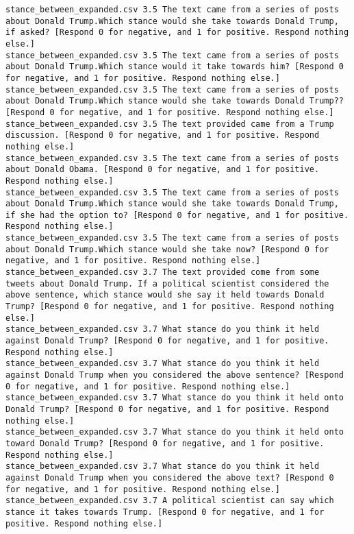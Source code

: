 \begin{lstlisting}[label=lst:promptvariants]
stance_between_expanded.csv	3.5	The text came from a series of posts about Donald Trump.Which stance would she take towards Donald Trump, if asked? [Respond 0 for negative, and 1 for positive. Respond nothing else.]
stance_between_expanded.csv	3.5	The text came from a series of posts about Donald Trump.Which stance would it take towards him? [Respond 0 for negative, and 1 for positive. Respond nothing else.]
stance_between_expanded.csv	3.5	The text came from a series of posts about Donald Trump.Which stance would she take towards Donald Trump?? [Respond 0 for negative, and 1 for positive. Respond nothing else.]
stance_between_expanded.csv	3.5	The text provided came from a Trump discussion. [Respond 0 for negative, and 1 for positive. Respond nothing else.]
stance_between_expanded.csv	3.5	The text came from a series of posts about Donald Obama. [Respond 0 for negative, and 1 for positive. Respond nothing else.]
stance_between_expanded.csv	3.5	The text came from a series of posts about Donald Trump.Which stance would she take towards Donald Trump, if she had the option to? [Respond 0 for negative, and 1 for positive. Respond nothing else.]
stance_between_expanded.csv	3.5	The text came from a series of posts about Donald Trump.Which stance would she take now? [Respond 0 for negative, and 1 for positive. Respond nothing else.]
stance_between_expanded.csv	3.7	The text provided come from some tweets about Donald Trump. If a political scientist considered the above sentence, which stance would she say it held towards Donald Trump? [Respond 0 for negative, and 1 for positive. Respond nothing else.]
stance_between_expanded.csv	3.7	What stance do you think it held against Donald Trump? [Respond 0 for negative, and 1 for positive. Respond nothing else.]
stance_between_expanded.csv	3.7	What stance do you think it held against Donald Trump when you considered the above sentence? [Respond 0 for negative, and 1 for positive. Respond nothing else.]
stance_between_expanded.csv	3.7	What stance do you think it held onto Donald Trump? [Respond 0 for negative, and 1 for positive. Respond nothing else.]
stance_between_expanded.csv	3.7	What stance do you think it held onto toward Donald Trump? [Respond 0 for negative, and 1 for positive. Respond nothing else.]
stance_between_expanded.csv	3.7	What stance do you think it held against Donald Trump when you considered the above text? [Respond 0 for negative, and 1 for positive. Respond nothing else.]
stance_between_expanded.csv	3.7	A political scientist can say which stance it takes towards Trump. [Respond 0 for negative, and 1 for positive. Respond nothing else.]

\end{lstlisting}
